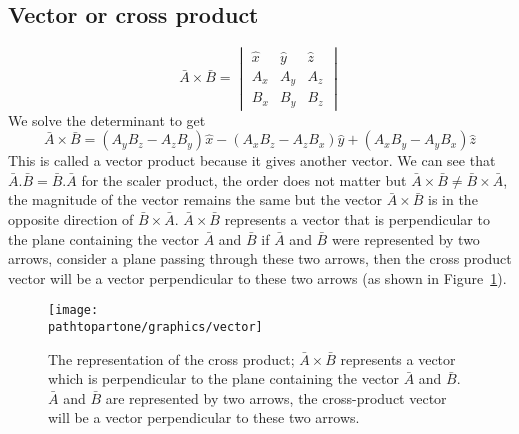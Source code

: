 \subsection{Vector or cross product}
\begin{dmath*}
\bar{A} \times \bar{B} = 
\begin{vmatrix}
\hat{x} & \hat{y} & \hat{z}\\
A_{x} & A_{y} & A_{z} \\
B_{x} & B_{y} & B_{z} 
\end{vmatrix}
\end{dmath*}
We solve the determinant to get 
\begin{dmath}
\bar{A} \times \bar{B} = (A_{y}B_{z} - A_{z}B_{y})\hat{x} - (A_{x}B_{z} - A_{z}B_{x})\hat{y} + (A_{x}B_{y} - A_{y}B_{x})\hat{z}
\end{dmath}
This is called a vector product because it gives another vector. We can see that $\bar{A}.\bar{B} = \bar{B}.\bar{A} $ for the scaler product, the order does not matter but $\bar{A} \times \bar{B} \neq \bar{B} \times \bar{A}$, the magnitude of the vector remains the same but the vector $\bar{A} \times \bar{B}$ is in the opposite direction of $\bar{B} \times \bar{A}$. $\bar{A} \times \bar{B}$ represents a vector that is perpendicular to the plane containing the vector $\bar{A}$ and $\bar{B}$ if $\bar{A}$ and $\bar{B}$ were represented by two arrows, consider a plane passing through these two arrows, then the cross product vector will be a vector perpendicular to these two arrows (as shown in Figure~\ref{fig:vector}).
\begin{figure}[h]
\centering
\texttt{[image: \\pathtopartone/graphics/vector]}
\caption{The representation of the cross product; $\bar{A} \times \bar{B}$ represents a vector which is perpendicular to the plane containing the vector $\bar{A}$ and $\bar{B}$. $\bar{A}$ and $\bar{B}$ are represented by two arrows, the cross-product vector will be a vector perpendicular to these two arrows.}
\label{fig:vector}
\end{figure}

